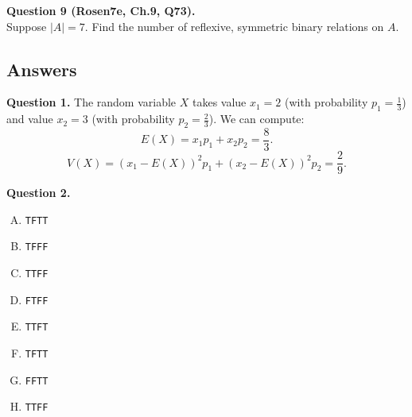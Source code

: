 \documentclass[jou]{apa6}
\begin{document}
\vspace{6pt}
{\bf Question 9 (Rosen7e, Ch.9, Q73).}\\
Suppose $|A| = 7$. Find the number of reflexive, symmetric binary relations on $A$.





\newpage

\subsection{Answers}


\vspace{6pt}
{\bf Question 1.} 
The random variable $X$ takes value $x_1 = 2$ (with probability $p_1 = \frac{1}{3}$)
and value $x_2 = 3$ (with probability $p_2 = \frac{2}{3}$). 
We can compute: 
$$E(X) = x_1p_1 + x_2p_2 = \frac{8}{3}.$$
$$V(X) = (x_1 - E(X))^2p_1 + (x_2 - E(X))^2p_2 = \frac{2}{9}.$$

\vspace{6pt}
{\bf Question 2.} 
\begin{enumerate}[(A)]
\item {\tt TFTT}
\item {\tt TFFF}
\item {\tt TTFF}
\item {\tt FTFF}
\item {\tt TTFT}
\item {\tt TFTT}
\item {\tt FFTT}
\item {\tt TTFF}
\end{enumerate}
\end{document}
